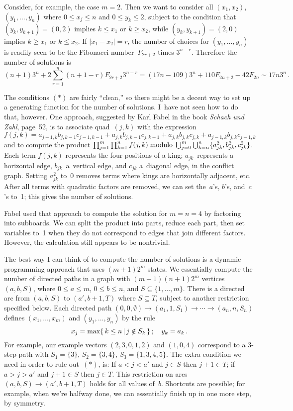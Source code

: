 Consider, for example, the case $m=2$. Then we want to consider all
$(x_1,x_2)$, $(y_1,\ldots,y_n)$ where $0\leq x_j\leq n$ and $0\leq y_k\leq 2$,
subject to the condition that $(y_k,y_{k+1})=(0,2)$ implies $k\leq x_1$ or
$k\geq x_2$, while $(y_k,y_{k+1})=(2,0)$ implies $k\geq x_1$ or $k\leq x_2$. If
$\vert x_1-x_2\vert=r$, the number of choices for $(y_1,\ldots,y_n)$  is
readily seen to be the Fibonacci number~$F_{2r+2}$ times $3^{n-r}$. Therefore
the number of solutions is 
$$(n+1)3^n+2\sum_{r=1}^n(n+1-r)F_{2r+2}3^{n-r}
=(17n-109)3^n+110F_{2n+2}-42F_{2n}\sim 17n3^n\,.$$

The conditions $(\ast)$ are fairly ``clean,'' so there might be a decent way to
set up a generating function for the number of solutions. I~have not seen how
to do that, however. One approach, suggested by Karl Fabel in the book {\sl
Schach und Zahl}, page~52, is to associate quad~$(j,k)$ with the expression
$$f(j,k)=a_{j-1,k}b_{j,k-1}c_{j-1,k-1}
+a_{j,k}b_{j,k-1}c_{j,k-1}+a_{j,k}b_{j,k}c_{j,k}+a_{j-1,k}b_{j,k}c_{j-1,k}$$
and to compute the product
$\prod_{j=1}^m\prod_{k=1}^nf(j,k)\;{\rm modulo}\;\bigcup_{j=0}^m
\bigcup_{k=n}^n\{a^2_{jk},b^2_{jk},c^2_{jk}\}$.
Each term $f(j,k)$ represents the four positions of a king; $a_{jk}$~represents
a horizontal edge, $b_{jk}$~a~vertical edge, and $c_{jk}$ a~diagonal edge, in
the conflict graph. Setting $a^2_{jk}$ to~0 removes terms where kings are
horizontally adjacent, etc. After all terms with quadratic factors are removed,
we can set the~$a$'s, $b$'s, and~$c$'s to~1; this gives the number of
solutions.

Fabel used that approach to compute the solution for $m=n=4$ by factoring into
subboards. We can split the product into parts, reduce each part, then set
variables to~1 when they do not correspond to edges that join different
factors. However, the calculation still appears to be nontrivial.

The best way I can think of to compute the number of solutions is a dynamic
programming approach that uses $(m+1)2^m$ states. We essentially compute the
number of directed paths in a graph with $(m+1)(n+1)2^m$ vertices $(a,b,S)$,
where $0\leq a\leq m$, $0\leq b\leq n$, and $S\subseteq\{1,\ldots,m\}$. There
is a directed arc from $(a,b,S)$ to $(a',b+1,T)$ where $S\subseteq T$, subject
to another restriction specified below. Each directed path $(0,0,\emptyset)
\rightarrow (a_1,1,S_1)\rightarrow\cdots\rightarrow(a_n,n,S_n)$ defines 
$(x_1,\ldots,x_m)$ and $(y_1,\ldots,y_n)$ by the rule
$$x_j=\max\{\,k\leq n\,\vert\, j\notin S_k\,\}\,;\quad y_k=a_k\,.$$
For example, our example vectors $(2,3,0,1,2)$ and $(1,0,4)$ correspond to a
3-step path with $S_1=\{3\}$, $S_2=\{3,4\}$, $S_3=\{1,3,4,5\}$. The extra
condition we need in order to rule out~$(\ast)$, is: If $a<j<a'$ and $j\in S$
then $j+1\in T$; if  $a>j>a'$ and $j+1\in S$ then $j\in T$. This restriction on
arcs $(a,b,S)\rightarrow (a',b+1,T)$ holds for all values of~$b$. Shortcuts are
possible; for example, when we're halfway done, we can essentially finish up in
one more step, by symmetry.

